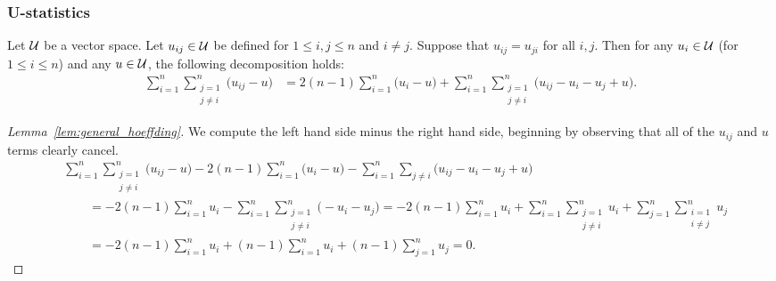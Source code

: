 \subsubsection{U-statistics}

\begin{lemma}
  \label{lem:general_hoeffding}

  Let $\mathcal{U}$ be a vector space.
  Let $u_{ij} \in \mathcal{U}$ be defined for
  $1 \leq i, j \leq n$
  and
  $i \neq j$.
  Suppose that $u_{ij} = u_{ji}$
  for all $i,j$.
  Then for any $u_i \in \mathcal{U}$
  (for $1 \leq i \leq n$)
  and any $u \in \mathcal{U}$,
  the following decomposition holds:
  \begin{align*}
    \sum_{i=1}^n
    \sum_{\substack{j=1 \\ j \neq i}}^n
    \big(u_{ij} - u\big)
    &=
    2(n-1)
    \sum_{i=1}^n
    \big(u_i - u\big)
    +
    \sum_{i=1}^n
    \sum_{\substack{j=1 \\ j \neq i}}^n
    \big(u_{ij} - u_i - u_j + u\big).
  \end{align*}

\end{lemma}

\begin{proof}[Lemma~\ref{lem:general_hoeffding}]

  We compute the left hand side minus the right hand side,
  beginning by observing that all of the
  $u_{ij}$ and $u$ terms clearly cancel.
  \begin{align*}
    &\sum_{i=1}^n
    \sum_{\substack{j=1 \\ j \neq i}}^n
    \big(u_{ij} - u\big)
    - 2(n-1)
    \sum_{i=1}^n
    \big(u_i - u\big)
    -
    \sum_{i=1}^n
    \sum_{j \neq i}
    \big(u_{ij} - u_i - u_j + u\big) \\
    &\qquad=
    - 2(n-1)
    \sum_{i=1}^n
    u_i
    -
    \sum_{i=1}^n
    \sum_{\substack{j=1 \\ j \neq i}}^n
    \big(- u_i - u_j\big)
    =
    - 2(n-1)
    \sum_{i=1}^n
    u_i
    +
    \sum_{i=1}^n
    \sum_{\substack{j=1 \\ j \neq i}}^n
    u_i
    +
    \sum_{j=1}^n
    \sum_{\substack{i=1 \\ i \neq j}}^n
    u_j \\
    &\qquad=
    - 2(n-1)
    \sum_{i=1}^n
    u_i
    +
    (n-1)
    \sum_{i=1}^n
    u_i
    +
    (n-1)
    \sum_{j=1}^n
    u_j
    = 0.
  \end{align*}
\end{proof}

